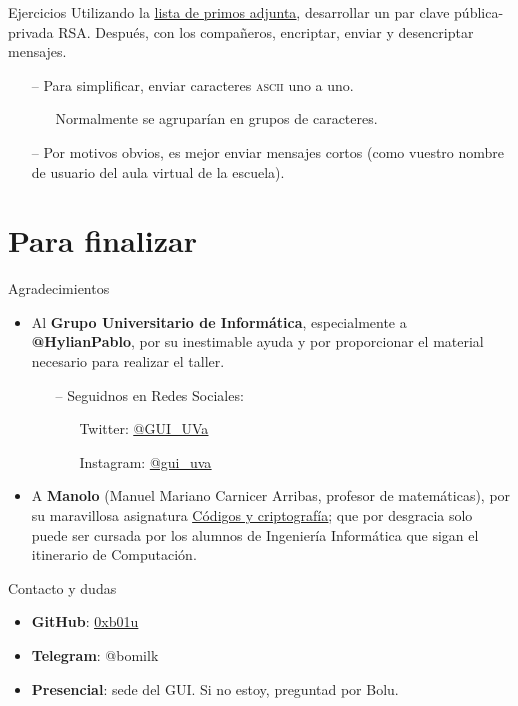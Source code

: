 \documentclass[10pt]{beamer} %
\begin{document}
\begin{frame}{Ejercicios}
    Utilizando la \href{https://github.com/0xb01u/GUI-RSA/blob/master/transparencias/src/ListaPrimos.pdf}{\underline{lista de primos adjunta}}, desarrollar un par clave pública-privada RSA. Después, con los compañeros, encriptar, enviar y desencriptar mensajes.
    \begin{itemize}
        \item[--] Para simplificar, enviar caracteres \textsc{ascii} uno a uno.
        \begin{itemize}
            \item[] Normalmente se agruparían en grupos de caracteres. 
        \end{itemize}
        \item[--] Por motivos obvios, es mejor enviar mensajes cortos (como vuestro nombre de usuario del aula virtual de la escuela).
    \end{itemize}
\end{frame}
\section{Para finalizar}
\begin{frame}{Agradecimientos}
\begin{itemize}
    \item Al \textbf{Grupo Universitario de Informática}, especialmente a \textbf{@HylianPablo}, por su inestimable ayuda y por proporcionar el material necesario para realizar el taller.
    \begin{itemize}
        \item[--] Seguidnos en Redes Sociales:
        \begin{itemize}
            \item[] Twitter: \href{https://twitter.com/GUI\_UVa}{\underline{@GUI\_UVa}}
            \item[] Instagram: \href{https://www.instagram.com/gui_uva/}{\underline{@gui\_uva}}
        \end{itemize}
    \end{itemize}
    \item A \textbf{Manolo} (Manuel Mariano Carnicer Arribas, profesor de matemáticas), por su maravillosa asignatura \href{https://alojamientos.uva.es/guia_docente/uploads/2019/545/46948/1/Documento.pdf}{\underline{Códigos y criptografía}}; que por desgracia solo puede ser cursada por los alumnos de Ingeniería Informática que sigan el itinerario de Computación.
\end{itemize}
\end{frame}
\begin{frame}{Contacto y dudas}
\begin{itemize}
    \item \textbf{GitHub}: \href{https://github.com/0xb01u}{\underline{0xb01u}}
    \item \textbf{Telegram}: @bomilk
    \item \textbf{Presencial}: sede del GUI. Si no estoy, preguntad por Bolu.
\end{itemize}
\end{frame}
\end{document}
